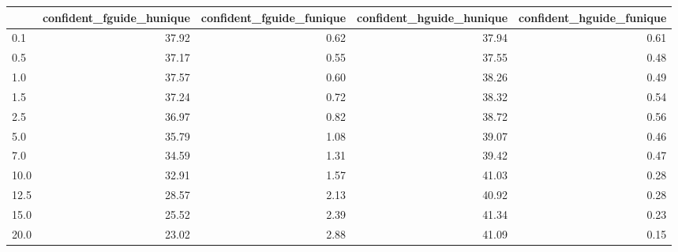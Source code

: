 \begin{tabular}{lrrrr}
\toprule
 & confident_fguide_hunique & confident_fguide_funique & confident_hguide_hunique & confident_hguide_funique \\
\midrule
0.1 & 37.92 & 0.62 & 37.94 & 0.61 \\
0.5 & 37.17 & 0.55 & 37.55 & 0.48 \\
1.0 & 37.57 & 0.60 & 38.26 & 0.49 \\
1.5 & 37.24 & 0.72 & 38.32 & 0.54 \\
2.5 & 36.97 & 0.82 & 38.72 & 0.56 \\
5.0 & 35.79 & 1.08 & 39.07 & 0.46 \\
7.0 & 34.59 & 1.31 & 39.42 & 0.47 \\
10.0 & 32.91 & 1.57 & 41.03 & 0.28 \\
12.5 & 28.57 & 2.13 & 40.92 & 0.28 \\
15.0 & 25.52 & 2.39 & 41.34 & 0.23 \\
20.0 & 23.02 & 2.88 & 41.09 & 0.15 \\
\bottomrule
\end{tabular}
